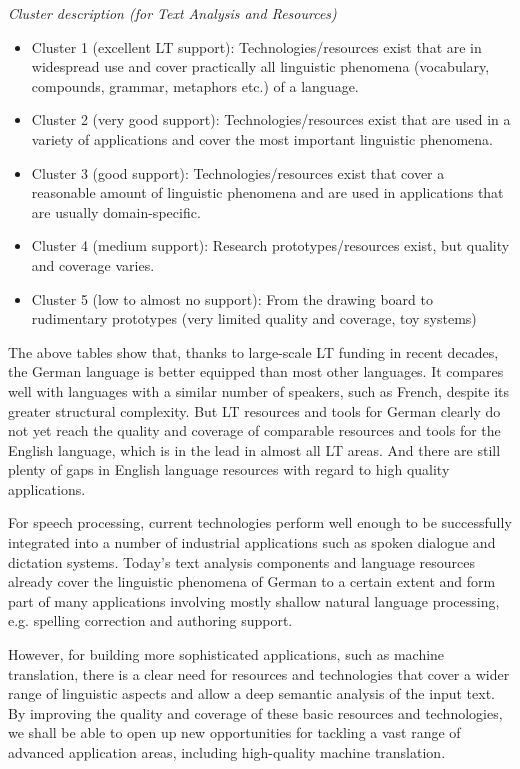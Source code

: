 \documentclass[]{../../metanetpaper}
\begin{document}
\begin{Parallel}[c]{80mm}{80mm}
{\textit{Cluster description (for Text Analysis and Resources)}
    \begin{itemize}
      \item Cluster 1 (excellent LT support): Technologies/resources exist that are in widespread use and cover practically all linguistic phenomena (vocabulary, compounds, grammar, metaphors etc.) of a language.
      \item Cluster 2 (very good support): Technologies/resources exist that are used in a variety of applications and cover the most important linguistic phenomena. 
      \item Cluster 3 (good support): Technologies/resources exist that cover a reasonable amount of linguistic phenomena and are used in applications that are usually domain-specific.
      \item Cluster 4 (medium support): Research prototypes/resources exist, but quality and coverage varies.
      \item Cluster 5 (low to almost no support): From the drawing board to rudimentary prototypes (very limited quality and coverage, toy systems)
    \end{itemize}
    The above tables show that, thanks to large-scale LT funding in recent decades, the German language is better equipped than most other languages. It compares well with languages with a similar number of speakers, such as French, despite its greater structural complexity. But LT resources and tools for German clearly do not yet reach the quality and coverage of comparable resources and tools for the English language, which is in the lead in almost all LT areas. And there are still plenty of gaps in English language resources with regard to high quality applications.

    For speech processing, current technologies perform well enough to be successfully integrated into a number of industrial applications such as spoken dialogue and dictation systems. Today’s text analysis components and language resources already cover the linguistic phenomena of German to a certain extent and form part of many applications involving mostly shallow natural language processing, e.g. spelling correction and authoring support.

    However, for building more sophisticated applications, such as machine translation, there is a clear need for resources and technologies that cover a wider range of linguistic aspects and allow a deep semantic analysis of the input text. By improving the quality and coverage of these basic resources and technologies, we shall be able to open up new opportunities for tackling a vast range of advanced application areas, including high-quality machine translation.
  }


\end{Parallel}
\end{document}
